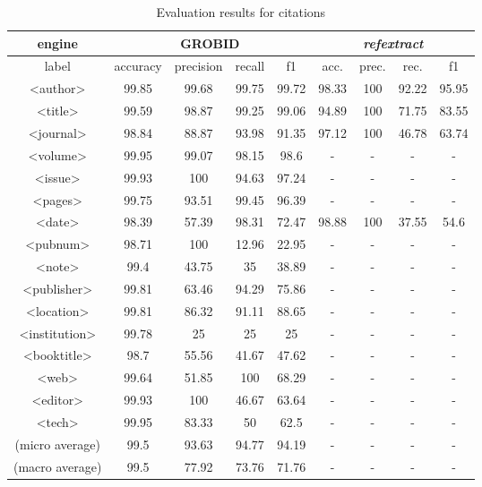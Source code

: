 \begin{table}[h]
\begin{center}
\begin{tabular}{|c|cccc|cccc|}
\hline
engine &  \multicolumn{4}{c}{GROBID} & \multicolumn{4}{c}{\emph{refextract}}\\
\hline
label & accuracy & precision & recall & f1 & acc. & prec. & rec. & f1\\
\hline
<author>    & 99.85 &   99.68   &   99.75   &   99.72   & 98.33 &   100 &   92.22   &   95.95   \\
<title> &   99.59   &   98.87   &   99.25   &   99.06   & 94.89 &   100 &   71.75   &   83.55   \\
<journal>   & 98.84 &   88.87   &   93.98   &   91.35   & 97.12 &   100 &   46.78   &   63.74   \\
<volume>&   99.95   &   99.07   &   98.15   &   98.6    & -     &   -   &   -       &   -   \\
<issue> &   99.93   &   100     &   94.63   &   97.24   & -     &   -   &   -       &   -   \\
<pages> &   99.75   &   93.51   &   99.45   &   96.39   & -     &   -   &   -       &   -   \\
<date>  &   98.39   &   57.39   &   98.31   &   72.47   & 98.88 &   100 &   37.55   &   54.6    \\
<pubnum>&   98.71   &   100     &   12.96   &   22.95   & -     &   -   &   -       &   -   \\
<note>  &   99.4    &   43.75   &   35      &   38.89   & -     &   -   &   -       &   -   \\
<publisher>&99.81   &   63.46   &   94.29   &   75.86   & -     &   -   &   -       &   -   \\
<location>& 99.81   &   86.32   &   91.11   &   88.65   & -     &   -   &   -       &   -   \\
<institution>& 99.78&   25      &   25      &   25      & -     &   -   &   -       &   -   \\
<booktitle>&    98.7&   55.56   &   41.67   &   47.62   & -     &   -   &   -       &   -   \\
<web>   &   99.64   &   51.85   &   100     &   68.29   & -     &   -   &   -       &   -   \\
<editor>    &  99.93&   100     &46.67      &   63.64   & -     &   -   &   -       &   -   \\
<tech>  &   99.95   &   83.33   &   50      &   62.5    & -     &   -   &   -       &   -   \\
\hline
(micro average) & 99.5  &   93.63   &   94.77   &   94.19 & -    &   - &   -   &   -   \\
(macro average) & 99.5  &   77.92   &   73.76   &   71.76 & -    &   -  &   -   &   -   \\
\hline
\end{tabular}
\caption[Evaluation results for citations]{Evaluation results for citations}
\label{table:citationcomparison}
\end{center}
\end{table}

